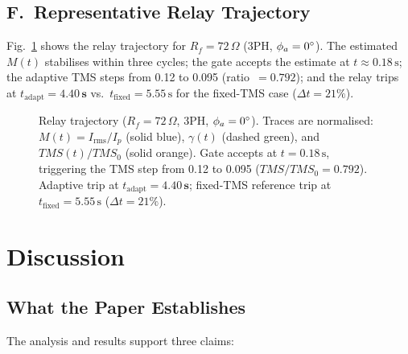 \documentclass[10pt,journal,twoside]{IEEEtran}
\newcommand{\sss}{\,\text{s}}
\newcommand{\Rf}{R_{\!f}}
\newcommand{\tms}{TMS}
\begin{document}
\subsection{F.\ Representative Relay Trajectory}
\label{sec:results:trajectory}

Fig.~\ref{fig:trajectory} shows the relay trajectory for
$\Rf = 72\,\Omega$ (3PH, $\phi_a = 0\degree$).
The estimated $M(t)$ stabilises within three cycles; the gate accepts the
estimate at $t \approx 0.18\sss$; the adaptive TMS steps from 0.12 to 0.095
(ratio~$= 0.792$);
and the relay trips at $t_{\mathrm{adapt}} = \mathbf{4.40\sss}$ vs.\
$t_{\mathrm{fixed}} = 5.55\sss$ for the fixed-TMS case ($\Delta t = 21\%$).

\begin{figure}[!t]
\centering

\caption{Relay trajectory ($\Rf = 72\,\Omega$, 3PH, $\phi_a=0\degree$).
  Traces are normalised: $M(t) = I_{\mathrm{rms}}/I_p$ (solid blue),
  $\gamma(t)$ (dashed green), and $\tms(t)/\tms_0$ (solid orange).
  Gate accepts at $t = 0.18\sss$, triggering the TMS step from 0.12 to 0.095
  ($TMS/TMS_0 = 0.792$).
  Adaptive trip at $t_{\mathrm{adapt}} = \mathbf{4.40\sss}$; fixed-TMS
  reference trip at $t_{\mathrm{fixed}} = 5.55\sss$ ($\Delta t = 21\%$).}
\label{fig:trajectory}
\end{figure}

\section{Discussion}
\label{sec:discussion}

\subsection{What the Paper Establishes}

The analysis and results support three claims:
\end{document}
